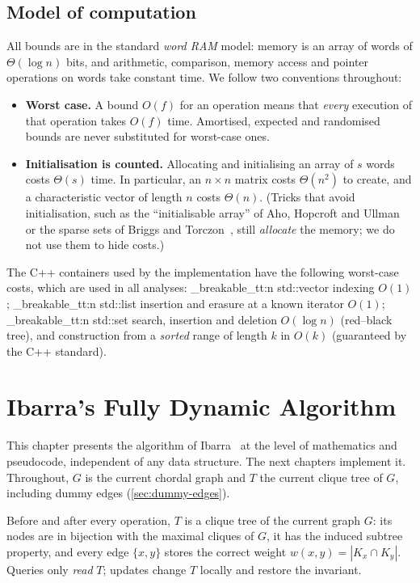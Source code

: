 \documentclass[11pt,a4paper,oneside]{report}
\theoremstyle{plain}
\theoremstyle{definition}
\theoremstyle{remark}
\DeclareRobustCommand{\code}[1]{\mtp_breakable_tt:n {#1}}
\begin{document}
\section{Model of computation}\label{sec:model}
All bounds are in the standard \emph{word RAM} model: memory is an array of words of
\(\Theta(\log n)\) bits, and arithmetic, comparison, memory access and pointer operations on
words take constant time. We follow two conventions throughout:
\begin{itemize}
\item \textbf{Worst case.} A bound \(O(f)\) for an operation means that \emph{every} execution
  of that operation takes \(O(f)\) time. Amortised, expected and randomised bounds are never
  substituted for worst-case ones.
\item \textbf{Initialisation is counted.} Allocating and initialising an array of \(s\) words
  costs \(\Theta(s)\) time. In particular, an \(n\times n\) matrix costs \(\Theta(n^2)\) to
  create, and a characteristic vector of length \(n\) costs \(\Theta(n)\). (Tricks that
  avoid initialisation, such as the ``initialisable array'' of Aho, Hopcroft and
  Ullman~\cite{aho1974} or the sparse sets of Briggs and Torczon~\cite{briggs1993}, still
  \emph{allocate} the memory; we do not use them to hide costs.)
\end{itemize}
The C++ containers used by the implementation have the following worst-case costs, which are
used in all analyses: \code{std::vector} indexing \(O(1)\); \code{std::list} insertion and
erasure at a known iterator \(O(1)\); \code{std::set} search, insertion and deletion
\(O(\log n)\) (red--black tree), and construction from a \emph{sorted} range of length \(k\)
in \(O(k)\) (guaranteed by the C++ standard).
\chapter{Ibarra's Fully Dynamic Algorithm}\label{ch:ibarra}
This chapter presents the algorithm of Ibarra~\cite{ibarra2008} at the level of mathematics and
pseudocode, independent of any data structure. The next chapters implement it. Throughout,
\(G\) is the current chordal graph and \(T\) the current clique tree of \(G\), including dummy
edges (\cref{sec:dummy-edges}).

\begin{keyidea}
Before and after every operation, \(T\) is a clique tree of the current graph \(G\):
its nodes are in bijection with the maximal cliques of \(G\), it has the induced subtree
property, and every edge \(\{x,y\}\) stores the correct weight \(w(x,y)=|K_x\cap K_y|\).
Queries only \emph{read} \(T\); updates change \(T\) locally and restore the invariant.
\end{keyidea}
\end{document}
